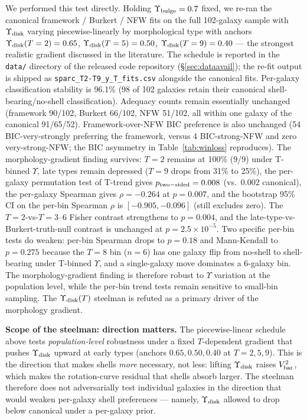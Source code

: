 \documentclass[linenumbers]{aastex701}
\newcommand{\Yt}{\Upsilon}
\newcommand{\Ydisk}{\Upsilon_{\rm disk}}
\newcommand{\Ybulge}{\Upsilon_{\rm bulge}}
\newcommand{\Vbar}{V_{\rm bar}}
\begin{document}
We performed this test directly. Holding $\Ybulge = 0.7$ fixed, we re-ran the canonical framework / Burkert / NFW fits on the full 102-galaxy sample with $\Ydisk$ varying piecewise-linearly by morphological type with anchors $\Ydisk(T=2) = 0.65$, $\Ydisk(T=5) = 0.50$, $\Ydisk(T=9) = 0.40$ \citep{Schombert2022} --- the strongest realistic gradient discussed in the literature. The schedule is reported in the \texttt{data/} directory of the released code repository (\S\ref{sec:dataavail}); the re-fit output is shipped as \texttt{sparc\_T2-T9\_y\_T\_fits.csv} alongside the canonical fits. Per-galaxy classification stability is 96.1\% (98 of 102 galaxies retain their canonical shell-bearing/no-shell classification). Adequacy counts remain essentially unchanged (framework 90/102, Burkert 66/102, NFW 51/102, all within one galaxy of the canonical 91/65/52). Framework-over-NFW BIC preference is also unchanged (54 BIC-very-strongly preferring the framework, versus 4 BIC-strong-NFW and zero very-strong-NFW; the BIC asymmetry in Table~\ref{tab:winloss} reproduces). The morphology-gradient finding survives: $T=2$ remains at 100\% (9/9) under T-binned $\Yt$, late types remain depressed ($T=9$ drops from 31\% to 25\%), the per-galaxy permutation test of T-trend gives $p_{\rm two-sided} = 0.008$ (vs.\ 0.002 canonical), the per-galaxy Spearman gives $\rho = -0.264$ at $p = 0.007$, and the bootstrap 95\% CI on the per-bin Spearman $\rho$ is $[-0.905, -0.096]$ (still excludes zero). The $T=2$-vs-$T=3$--$6$ Fisher contrast strengthens to $p = 0.004$, and the late-type-vs-Burkert-truth-null contrast is unchanged at $p = 2.5 \times 10^{-5}$. Two specific per-bin tests do weaken: per-bin Spearman drops to $p = 0.18$ and Mann-Kendall to $p = 0.275$ because the $T=8$ bin ($n=6$) has one galaxy flip from no-shell to shell-bearing under T-binned $\Yt$, and a single-galaxy move dominates a 6-galaxy bin. The morphology-gradient finding is therefore robust to $\Yt$ variation at the population level, while the per-bin trend tests remain sensitive to small-bin sampling. The $\Ydisk(T)$ steelman is refuted as a primary driver of the morphology gradient.

\textbf{Scope of the steelman: direction matters.} The piecewise-linear schedule above tests \emph{population-level} robustness under a fixed $T$-dependent gradient that pushes $\Ydisk$ upward at early types (anchors $0.65, 0.50, 0.40$ at $T = 2, 5, 9$). This is the direction that makes shells \emph{more} necessary, not less: lifting $\Ydisk$ raises $\Vbar^2$, which makes the rotation-curve residual that shells absorb larger. The steelman therefore does not adversarially test individual galaxies in the direction that would weaken per-galaxy shell preferences --- namely, $\Ydisk$ allowed to drop below canonical under a per-galaxy prior.
\end{document}
